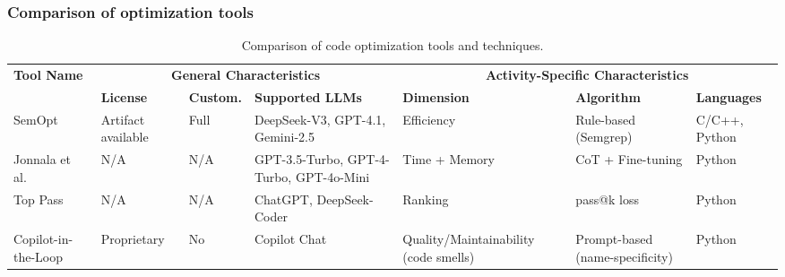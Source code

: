 \documentclass[10pt,a4paper]{article}
\begin{document}
\subsubsection{Comparison of optimization tools}
\begin{table}[!t]
\centering
\caption{Comparison of code optimization tools and techniques.}
\label{tab:cmp_optimization}
\footnotesize
\setlength{\tabcolsep}{2pt}
\renewcommand{\arraystretch}{1.1}
\begin{tabularx}{\textwidth}{@{}p{65pt}p{52pt}p{32pt}p{75pt}p{70pt}p{100pt}X@{}}
\toprule
\multirow{2}{*}{\textbf{Tool Name}} & \multicolumn{3}{c}{\textbf{General Characteristics}} & \multicolumn{3}{c}{\textbf{Activity-Specific Characteristics}} \\
\cmidrule(lr){2-4} \cmidrule(lr){5-7}
 & \textbf{License} & \textbf{Custom.} & \textbf{Supported LLMs} & \textbf{Dimension} & \textbf{Algorithm} & \textbf{Languages} \\
\midrule
SemOpt~\cite{zhao2025semopt} & Artifact available & Full & DeepSeek-V3, GPT-4.1, Gemini-2.5 & Efficiency & Rule-based (Semgrep) & C/C++, Python \\
Jonnala et al.~\cite{jonnala2025} & N/A & N/A & GPT-3.5-Turbo, GPT-4-Turbo, GPT-4o-Mini & Time + Memory & CoT + Fine-tuning & Python \\
Top Pass~\cite{lyu2025toppass} & N/A & N/A & ChatGPT, DeepSeek-Coder & Ranking & pass@k loss & Python \\
Copilot-in-the-Loop~\cite{zhang2024copilot} & Proprietary & No & Copilot Chat & Quality/Maintainability (code smells) & Prompt-based (name-specificity) & Python \\
\bottomrule
\end{tabularx}
\end{table}
\end{document}
